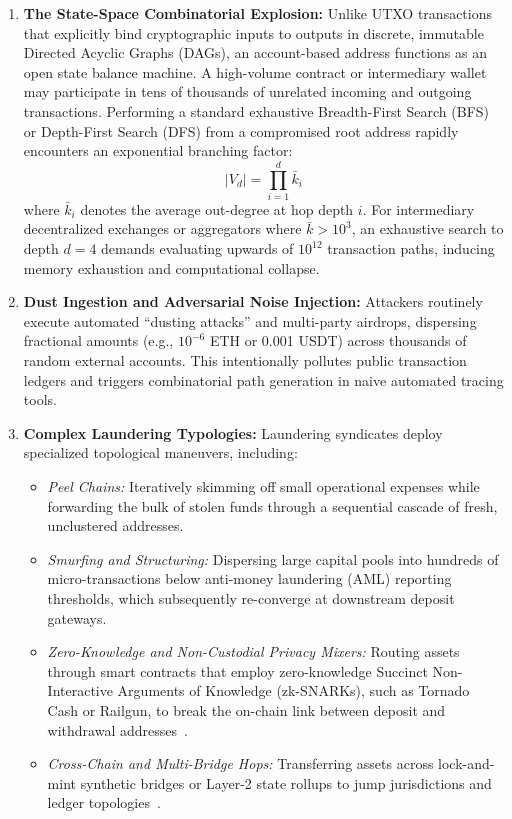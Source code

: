 \begin{enumerate}[label=(\roman*)]
    \item \textbf{The State-Space Combinatorial Explosion:} Unlike UTXO transactions that explicitly bind cryptographic inputs to outputs in discrete, immutable Directed Acyclic Graphs (DAGs), an account-based address functions as an open state balance machine. A high-volume contract or intermediary wallet may participate in tens of thousands of unrelated incoming and outgoing transactions. Performing a standard exhaustive Breadth-First Search (BFS) or Depth-First Search (DFS) from a compromised root address rapidly encounters an exponential branching factor:
    \begin{equation}
        |V_d| = \prod_{i=1}^{d} \bar{k}_i
    \end{equation}
    where $\bar{k}_i$ denotes the average out-degree at hop depth $i$. For intermediary decentralized exchanges or aggregators where $\bar{k} > 10^3$, an exhaustive search to depth $d=4$ demands evaluating upwards of $10^{12}$ transaction paths, inducing memory exhaustion and computational collapse.
    
    \item \textbf{Dust Ingestion and Adversarial Noise Injection:} Attackers routinely execute automated ``dusting attacks'' and multi-party airdrops, dispersing fractional amounts (e.g., $10^{-6}$ ETH or 0.001 USDT) across thousands of random external accounts. This intentionally pollutes public transaction ledgers and triggers combinatorial path generation in naive automated tracing tools.
    
    \item \textbf{Complex Laundering Typologies:} Laundering syndicates deploy specialized topological maneuvers, including:
    \begin{itemize}
        \item \emph{Peel Chains:} Iteratively skimming off small operational expenses while forwarding the bulk of stolen funds through a sequential cascade of fresh, unclustered addresses.
        \item \emph{Smurfing and Structuring:} Dispersing large capital pools into hundreds of micro-transactions below anti-money laundering (AML) reporting thresholds, which subsequently re-converge at downstream deposit gateways.
        \item \emph{Zero-Knowledge and Non-Custodial Privacy Mixers:} Routing assets through smart contracts that employ zero-knowledge Succinct Non-Interactive Arguments of Knowledge (zk-SNARKs), such as Tornado Cash or Railgun, to break the on-chain link between deposit and withdrawal addresses~\cite{pertsev2020tornado, ghesmati2022deanonymizing}.
        \item \emph{Cross-Chain and Multi-Bridge Hops:} Transferring assets across lock-and-mint synthetic bridges or Layer-2 state rollups to jump jurisdictions and ledger topologies~\cite{wang2022characterizing}.
    \end{itemize}


\end{enumerate}

